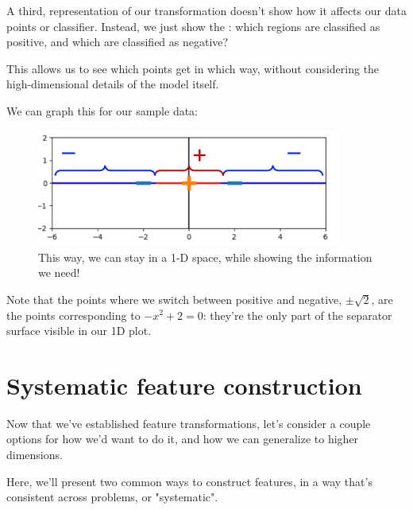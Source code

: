             \begin{concept}
                A third,  representation of our transformation doesn't show how it affects our data points or classifier. Instead, we just show the : which regions are classified as positive, and which are classified as negative?

                This allows us to see which points get  in which way, without considering the high-dimensional details of the model itself.
            \end{concept}

            \miniex We can graph this for our sample data:

            \begin{figure}[H]
                \centering
                \includegraphics[width=100mm,scale=0.5]{images/feature_images/positive_negative_disp.png}
                \caption*{This way, we can stay in a 1-D space, while showing the information we need!}
            \end{figure}

            Note that the points where we switch between positive and negative, $\pm \sqrt{2}$, are the points corresponding to $-x^2+2=0$: they're the only part of the separator surface visible in our 1D plot.


        \secdiv

    \pagebreak

    \section{Systematic feature construction}

        Now that we've established feature transformations, let's consider a couple options for how we'd want to do it, and how we can generalize to higher dimensions. 

        Here, we'll present two common ways to construct features, in a way that's consistent across problems, or "systematic".

